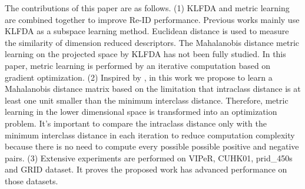 \documentclass[conference,compsoc]{IEEEtran}
\begin{document}
\indent The contributions of this paper are as follows. (1) KLFDA and metric learning are combined together to improve Re-ID performance. Previous works mainly use KLFDA as a subspace learning method. Euclidean distance is used to measure the similarity of dimension reduced descriptors. The Mahalanobis distance metric learning on the projected space by KLFDA has not been fully studied. In this paper, metric learning is performed by an iterative computation based on gradient optimization. (2) Inspired by \cite{TDL}, in this work we propose to learn a Mahalanobis distance matrix based on the limitation that intraclass distance is at least one unit smaller than the minimum interclass distance. Therefore, metric learning in the lower dimensional space is transformed into an optimization problem. It's important to compare the intraclass distance only with the minimum interclass distance in each iteration to reduce computation complexity because there is no need to compute every possible possible positive and negative pairs. (3) Extensive experiments are performed on VIPeR, CUHK01, prid\_450s and GRID dataset. It proves the proposed work has advanced performance on those datasets.



%

%
%
\end{document}
